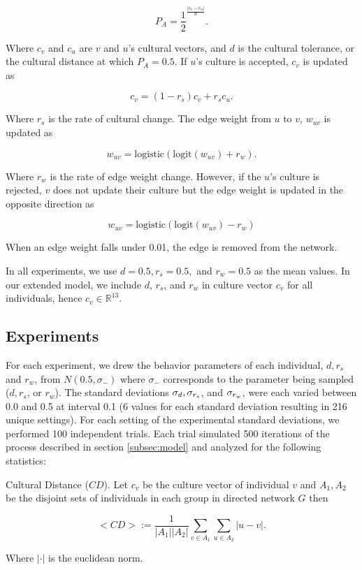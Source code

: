     \[P_A = \frac{1}{2} ^ {\frac{|c_v - c_u|}{d}} .\]

    Where $c_v$ and $c_u$ are $v$ and $u$'s cultural vectors, and $d$ is the
    cultural tolerance, or the cultural distance at which $P_A = 0.5$.
    If $u$'s culture is accepted, $c_v$ is updated as

    \[c_v = (1-r_s)c_v + r_s c_u.\]

    Where $r_s$ is the rate of cultural change. The edge weight from $u$ to
    $v$, $w_{uv}$ is updated as

    \[w_{uv} = \text{logistic}(\text{logit}(w_{uv}) + r_w).\]

    Where $r_w$ is the rate of edge weight change. 
    However, if the $u$'s culture is rejected, $v$ does not update their culture
    but the edge weight is updated in the opposite direction as

    \[w_{uv} = \text{logistic}(\text{logit}(w_{uv}) - r_w)\]

    When an edge weight falls under 0.01, the edge is removed from the network.
    
    In all experiments, we use $d=0.5, r_s=0.5,$ and $r_w = 0.5$ as the mean
    values.
    In our extended model, we include $d$, $r_s$, and $r_w$ in
    culture vector $c_v$ for all individuals, hence $c_v \in \mathbb{R}^{13}$.

\subsection{Experiments}\label{subsec:experiments}
    For each experiment, we drew the behavior parameters of each individual,
    $d, r_s$ and $r_w$, from $N(0.5, \sigma_{-})$ where
    $\sigma_{-}$ corresponds to the parameter being sampled ($d, r_s$, or $r_w$).
    The standard deviations $\sigma_d, \sigma_{r_s}$, and $\sigma_{r_w}$, were each varied
    between 0.0 and 0.5 at interval 0.1 (6 values for each standard deviation
    resulting in 216 unique settings).
    For each setting of the experimental standard deviations, we performed 100 independent
    trials.
    Each trial simulated 500 iterations of the process described in
    section \ref{subsec:model} and analyzed for the following statistics:

    \begin{defn}{Cultural Distance ($CD$).}
        Let $c_v$ be the culture vector of individual $v$ and $A_1, A_2$
        be the disjoint sets of individuals in each group in directed network $G$ then

        \[ <CD> := \frac{1}{|A_1||A_2|} \sum_{v \in A_1} \sum_{u \in A_2} |u - v|.\]

        Where $|\cdot|$ is the euclidean norm.
    \end{defn}

